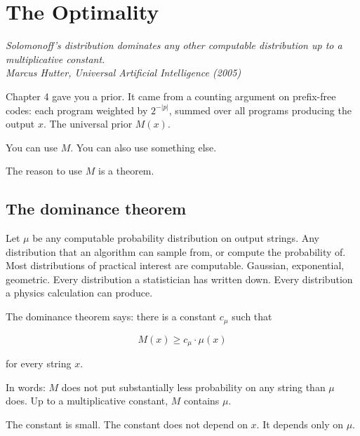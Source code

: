 \chapter{The Optimality}

\vspace{1em}
\hfill
\begin{minipage}[c]{0.55\textwidth}
\raggedleft
\small\itshape
Solomonoff's distribution dominates any other computable distribution up to a multiplicative constant.\\[0.5em]
\upshape\footnotesize Marcus Hutter, \textit{Universal Artificial Intelligence} (2005)
\end{minipage}%
\hspace{0.5em}
\begin{minipage}[c]{0.12\textwidth}
\end{minipage}
\vspace{1.5em}

\noindent Chapter 4 gave you a prior. It came from a counting argument on prefix-free codes: each program weighted by $2^{-|p|}$, summed over all programs producing the output $x$. The universal prior $M(x)$.

You can use $M$. You can also use something else.

The reason to use $M$ is a theorem.

\section*{The dominance theorem}

Let $\mu$ be any computable probability distribution on output strings. Any distribution that an algorithm can sample from, or compute the probability of. Most distributions of practical interest are computable. Gaussian, exponential, geometric. Every distribution a statistician has written down. Every distribution a physics calculation can produce.

The dominance theorem says: there is a constant $c_\mu$ such that

$$M(x) \geq c_\mu \cdot \mu(x)$$

for every string $x$.

In words: $M$ does not put substantially less probability on any string than $\mu$ does. Up to a multiplicative constant, $M$ contains $\mu$.

The constant is small. The constant does not depend on $x$. It depends only on $\mu$.

